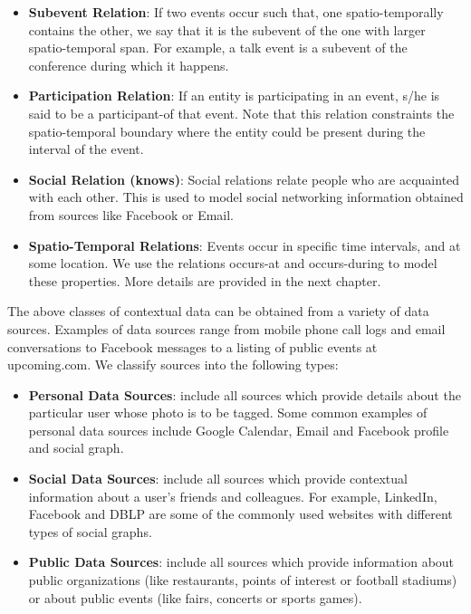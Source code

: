 \begin{itemize}
\item \textbf{Subevent Relation}: If two events occur such that, one spatio-temporally contains the other, we say that it is the subevent of the one with larger spatio-temporal span. For example, a talk event is a subevent of the conference during which it happens.
\item \textbf{Participation Relation}: If an entity is participating in an event, s/he is said to be a participant-of that event. Note that this relation constraints the spatio-temporal boundary where the entity could be present during the interval of the event.
\item \textbf{Social Relation (knows)}: Social relations relate people who are acquainted with each other. This is used to model social networking information obtained from sources like Facebook or Email.
\item \textbf{Spatio-Temporal Relations}: Events occur in specific time intervals, and at some location. We use the relations occurs-at and occurs-during to model these properties. More details are provided in the next chapter.
\end{itemize}

The above classes of contextual data can be obtained from a variety of data sources. Examples of data sources range from mobile phone call logs and email conversations to Facebook messages to a listing of public events at upcoming.com. We classify sources into the following types:

\begin{itemize}
\item \textbf{Personal Data Sources}: include all sources which provide details about the particular user whose photo is to be tagged. Some common examples of personal data sources include Google Calendar, Email and Facebook profile and social graph.
\item \textbf{Social Data Sources}: include all sources which provide contextual information about a user's friends and colleagues. For example, LinkedIn, Facebook and DBLP are some of the commonly used websites with different types of social graphs.
\item \textbf{Public Data Sources}: include all sources which provide information about public organizations (like restaurants, points of interest or football stadiums) or about public events (like fairs, concerts or sports games).
\end{itemize}

